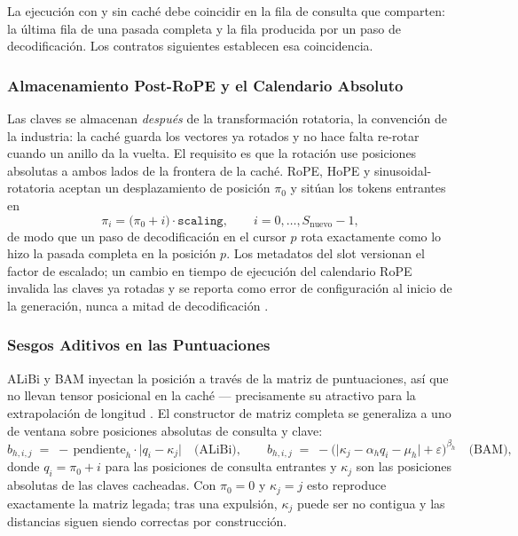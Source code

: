 La ejecución con y sin caché debe coincidir en la fila de consulta que comparten: la última fila de una pasada completa y la fila producida por un paso de decodificación. Los contratos siguientes establecen esa coincidencia.

\subsubsection{Almacenamiento Post-RoPE y el Calendario Absoluto}

Las claves se almacenan \emph{después} de la transformación rotatoria, la convención de la industria: la caché guarda los vectores ya rotados y no hace falta re-rotar cuando un anillo da la vuelta. El requisito es que la rotación use posiciones absolutas a ambos lados de la frontera de la caché. RoPE, HoPE y sinusoidal-rotatoria aceptan un desplazamiento de posición $\pi_0$ y sitúan los tokens entrantes en
\[
\pi_i = \big(\pi_0 + i\big)\cdot \texttt{scaling}, \qquad i = 0,\dots,S_{\text{nuevo}}-1 ,
\]
de modo que un paso de decodificación en el cursor $p$ rota exactamente como lo hizo la pasada completa en la posición $p$. Los metadatos del slot versionan el factor de escalado; un cambio en tiempo de ejecución del calendario RoPE invalida las claves ya rotadas y se reporta como error de configuración al inicio de la generación, nunca a mitad de decodificación \citep{su_rope_2024,dai_hope_2025}.

\subsubsection{Sesgos Aditivos en las Puntuaciones}

ALiBi y BAM inyectan la posición a través de la matriz de puntuaciones, así que no llevan tensor posicional en la caché --- precisamente su atractivo para la extrapolación de longitud \citep{press_alibi_2022,bianchessi_bam_2025}. El constructor de matriz completa se generaliza a uno de ventana sobre posiciones absolutas de consulta y clave:
\[
b_{h,i,j} \;=\; -\,\text{pendiente}_h \cdot \big|q_i - \kappa_j\big| \quad\text{(ALiBi)},
\qquad
b_{h,i,j} \;=\; -\Big(\big|\kappa_j - \alpha_h q_i - \mu_h\big| + \varepsilon\Big)^{\beta_h} \quad\text{(BAM)},
\]
donde $q_i = \pi_0 + i$ para las posiciones de consulta entrantes y $\kappa_j$ son las posiciones absolutas de las claves cacheadas. Con $\pi_0 = 0$ y $\kappa_j = j$ esto reproduce exactamente la matriz legada; tras una expulsión, $\kappa_j$ puede ser no contigua y las distancias siguen siendo correctas por construcción.

